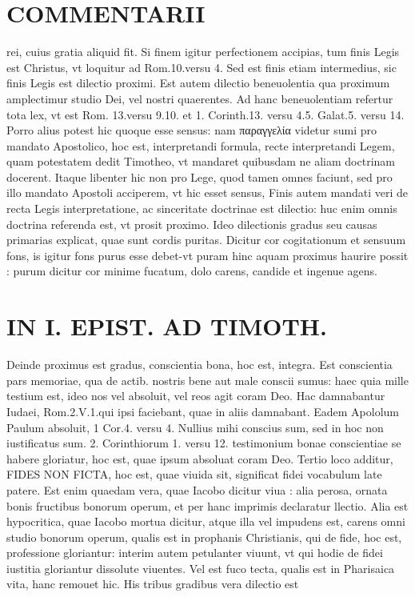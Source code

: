 \documentclass{article}
\begin{document}
\begin{pages}
\section*{COMMENTARII }
\marginpar{[ p.22 ]}\pstart rei, cuius gratia aliquid fit. Si finem igitur perfectionem accipias, tum finis Legis est Christus, vt loquitur ad Rom.10.versu 4. Sed est finis etiam intermedius, sic finis Legis est dilectio proximi. Est autem dilectio beneuolentia qua proximum amplectimur studio Dei, vel nostri quaerentes. Ad hanc beneuolentiam refertur tota lex, vt est Rom. 13.versu 9.10. et 1. Corinth.13. versu 4.5. Galat.5. versu 14. Porro alius potest hic quoque esse sensus: nam παραγγελία videtur sumi pro mandato Apostolico, hoc est, interpretandi formula, recte interpretandi Legem, quam potestatem dedit Timotheo, vt mandaret quibusdam ne aliam doctrinam docerent. Itaque libenter hic non pro Lege, quod tamen omnes faciunt, sed pro illo mandato Apostoli acciperem, vt hic esset sensus, Finis autem mandati veri de recta Legis interpretatione, ac sinceritate doctrinae est dilectio: huc enim omnis doctrina referenda est, vt prosit proximo. Ideo dilectionis gradus seu causas primarias explicat, quae sunt cordis puritas. Dicitur cor cogitationum et sensuum fons, is igitur fons purus esse debet-vt puram hinc aquam proximus haurire possit : purum dicitur cor minime fucatum, dolo carens, candide et ingenue agens.  \pend
\section*{IN I. EPIST. AD TIMOTH. }
\marginpar{[ p.23 ]}\pstart Deinde proximus est gradus, conscientia bona, hoc est, integra. Est conscientia pars memoriae, qua de actib. nostris bene aut male conscii sumus: haec quia mille testium est, ideo nos vel absoluit, vel reos agit coram Deo. Hac damnabantur Iudaei, Rom.2.V.1.qui ipsi faciebant, quae in aliis damnabant. Eadem Apololum Paulum absoluit, 1 Cor.4. versu 4. Nullius mihi conscius sum, sed in hoc non iustificatus sum. 2. Corinthiorum 1. versu 12. testimonium bonae conscientiae se habere gloriatur, hoc est, quae ipsum absoluat coram Deo.  \pend\pstart Tertio loco additur, FIDES NON FICTA, hoc est, quae viuida sit, significat fidei vocabulum late patere. Est enim quaedam vera, quae Iacobo dicitur viua : alia perosa, ornata bonis fructibus bonorum operum, et per hanc imprimis declaratur llectio. Alia est hypocritica, quae Iacobo mortua dicitur, atque illa vel impudens est, carens omni studio bonorum operum, qualis est in prophanis Christianis, qui de fide, hoc est, professione gloriantur: interim autem petulanter viuunt, vt qui hodie de fidei iustitia gloriantur dissolute viuentes. Vel est fuco tecta, qualis est in Pharisaica vita, hanc remouet hic. His tribus gradibus vera dilectio est  \pend

\end{pages}
\end{document}
